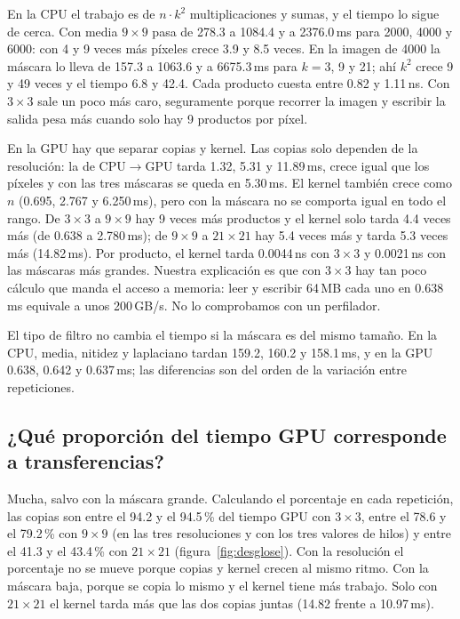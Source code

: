 \documentclass[12pt]{article}
\begin{document}
En la CPU el trabajo es de $n\cdot k^2$ multiplicaciones y sumas, y el tiempo lo sigue de cerca.
Con media $9\times9$ pasa de 278.3 a 1084.4 y a 2376.0\,ms para 2000, 4000 y 6000: con 4 y 9
veces más píxeles crece 3.9 y 8.5 veces. En la imagen de 4000 la máscara lo lleva de 157.3 a
1063.6 y a 6675.3\,ms para $k=3$, 9 y 21; ahí $k^2$ crece 9 y 49 veces y el tiempo 6.8 y 42.4.
Cada producto cuesta entre 0.82 y 1.11\,ns. Con $3\times3$ sale un poco más caro, seguramente
porque recorrer la imagen y escribir la salida pesa más cuando solo hay 9 productos por píxel.

En la GPU hay que separar copias y kernel. Las copias solo dependen de la resolución: la de
CPU$\to$GPU tarda 1.32, 5.31 y 11.89\,ms, crece igual que los píxeles y con las tres máscaras
se queda en 5.30\,ms. El kernel también crece como $n$ (0.695, 2.767 y 6.250\,ms), pero con la
máscara no se comporta igual en todo el rango. De $3\times3$ a $9\times9$ hay 9 veces más
productos y el kernel solo tarda 4.4 veces más (de 0.638 a 2.780\,ms); de $9\times9$ a
$21\times21$ hay 5.4 veces más y tarda 5.3 veces más (14.82\,ms). Por producto, el kernel tarda
0.0044\,ns con $3\times3$ y 0.0021\,ns con las máscaras más grandes. Nuestra explicación es que
con $3\times3$ hay tan poco cálculo que manda el acceso a memoria: leer y escribir 64\,MB cada
uno en 0.638\,ms equivale a unos 200\,GB/s. No lo comprobamos con un perfilador.

El tipo de filtro no cambia el tiempo si la máscara es del mismo tamaño. En la CPU, media,
nitidez y laplaciano tardan 159.2, 160.2 y 158.1\,ms, y en la GPU 0.638, 0.642 y 0.637\,ms; las
diferencias son del orden de la variación entre repeticiones.

\subsection{¿Qué proporción del tiempo GPU corresponde a transferencias?}

Mucha, salvo con la máscara grande. Calculando el porcentaje en cada repetición, las copias
son entre el 94.2 y el 94.5\,\% del tiempo GPU con $3\times3$, entre el 78.6 y el 79.2\,\% con
$9\times9$ (en las tres resoluciones y con los tres valores de hilos) y entre el 41.3 y el
43.4\,\% con $21\times21$ (figura~\ref{fig:desglose}). Con la resolución el porcentaje no se
mueve porque copias y kernel crecen al mismo ritmo. Con la máscara baja, porque se copia lo
mismo y el kernel tiene más trabajo. Solo con $21\times21$ el kernel tarda más que las dos
copias juntas (14.82 frente a 10.97\,ms).
\end{document}
